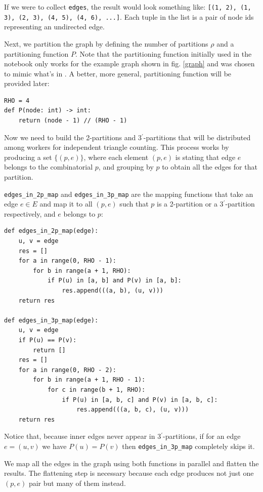 \documentclass[paper=a4, fontsize=11pt]{scrartcl}
\begin{document}
If we were to collect \texttt{edges}, the result would look
something like: \texttt{[(1, 2), (1, 3), (2, 3), (4, 5), (4, 6),
...]}. Each tuple in the list is a pair of node ids representing an undirected
edge.

Next, we partition the graph by defining the number of partitions $\rho$ and a
partitioning function $P$. Note that the partitioning function initially used in
the notebook only works for the example graph shown in fig. \ref{graph} and was
chosen to mimic what's in \cite{park2013efficient}. A better, more general,
partitioning function will be provided later:
\begin{verbatim}
RHO = 4
def P(node: int) -> int:
    return (node - 1) // (RHO - 1)
\end{verbatim}

Now we need to build the 2-partitions and 3$^\prime$-partitions that will be
distributed among workers for independent triangle counting. This process works
by producing a set $\{(p,e)\}$, where each element $(p,e)$ is stating that edge
$e$ belongs to the combinatorial $p$, and grouping by $p$ to obtain all the
edges for that partition.

\texttt{edges_in_2p_map} and \texttt{edges_in_3p_map}
are the mapping functions that take an edge $e\in E$ and map it to all $(p,e)$
such that $p$ is a 2-partition or a 3$^\prime$-partition respectively, and $e$
belongs to $p$:
\begin{verbatim}
def edges_in_2p_map(edge):
    u, v = edge
    res = []
    for a in range(0, RHO - 1):
        for b in range(a + 1, RHO):
            if P(u) in [a, b] and P(v) in [a, b]:
                res.append(((a, b), (u, v)))     
    return res

def edges_in_3p_map(edge):
    u, v = edge
    if P(u) == P(v):
        return []
    res = []
    for a in range(0, RHO - 2):
        for b in range(a + 1, RHO - 1):
            for c in range(b + 1, RHO):
                if P(u) in [a, b, c] and P(v) in [a, b, c]:
                    res.append(((a, b, c), (u, v)))
    return res
\end{verbatim}
Notice that, because inner edges never appear in 3$^\prime$-partitions, if for
an edge $e=(u,v)$ we have $P(u)=P(v)$ then \texttt{edges_in_3p_map}
completely skips it.

We map all the edges in the graph using both functions in parallel and flatten
the results. The flattening step is necessary because each edge produces not
just one $(p,e)$ pair but many of them instead.
\end{document}
